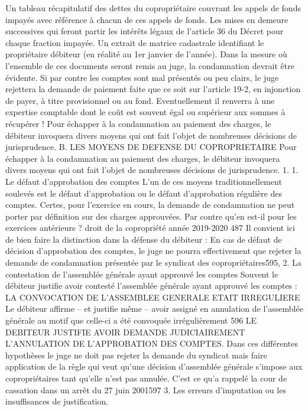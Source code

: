 Un tableau récapitulatif des dettes du copropriétaire couvrant les appels de fonds impayés avec référence à chacun de ces appels de fonds.
Les mises en demeure successives qui feront partir les intérêts légaux de l'article 36 du Décret pour chaque fraction impayée.
Un extrait de matrice cadastrale identifiant le propriétaire débiteur (en réalité au 1er janvier de l’année).
Dans la mesure où l'ensemble de ces documents seront remis au juge, la condamnation devrait être évidente. Si par contre les comptes sont mal présentés ou peu clairs, le juge rejettera la demande de paiement faite que ce soit sur l’article 19-2, en injonction de payer, à titre provisionnel ou au fond. Eventuellement il renverra à une expertise comptable dont le coût est souvent égal ou supérieur aux sommes à récupérer !
Pour échapper à la condamnation au paiement des charges, le débiteur invoquera divers moyens qui ont fait l’objet de nombreuses décisions de jurisprudence.
B. LES MOYENS DE DEFENSE DU COPROPRIETAIRE
Pour échapper à la condamnation au paiement des charges, le débiteur invoquera divers moyens qui ont fait l’objet de nombreuses décisions de jurisprudence.
1. 1. Le défaut d’approbation des comptes
L’un de ces moyens traditionnellement soulevés est le défaut d’approbation ou le défaut d’approbation régulière des comptes.
Certes, pour l’exercice en cours, la demande de condamnation ne peut porter par définition sur des charges approuvées. Par contre qu’en est-il pour les exercices antérieurs ?
droit de la copropriété année 2019-2020
487
Il convient ici de bien faire la distinction dans la défense du débiteur :
En cas de défaut de décision d’approbation des comptes, le juge ne pourra effectivement que rejeter la demande de condamnation présentée par le syndicat des copropriétaires595,
2. La contestation de l’assemblée générale ayant approuvé les comptes
Souvent le débiteur justifie avoir contesté l’assemblée générale ayant approuvé les comptes :
LA CONVOCATION DE L’ASSEMBLEE GENERALE ETAIT IRREGULIERE
Le débiteur affirme – et justifie même – avoir assigné en annulation de l’assemblée générale au motif que celle-ci a été convoquée irrégulièrement 596
LE DEBITEUR JUSTIFIE AVOIR DEMANDE JUDICIAIREMENT L’ANNULATION DE L’APPROBATION DES COMPTES.
Dans ces différentes hypothèses le juge ne doit pas rejeter la demande du syndicat mais faire application de la règle qui veut qu’une décision d’assemblée générale s’impose aux copropriétaires tant qu’elle n’est pas annulée. C’est ce qu’a rappelé la cour de cassation dans un arrêt du 27 juin 2001597
3. Les erreurs d’imputation ou les insuffisances de justification.
